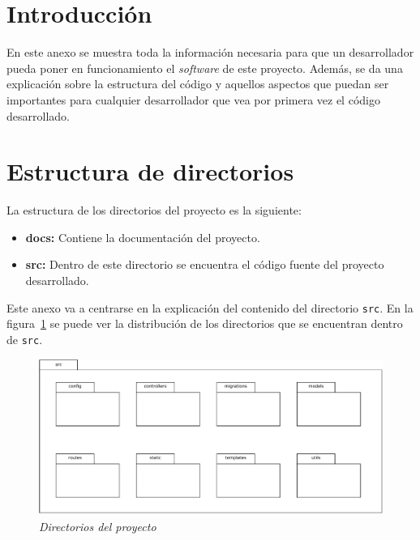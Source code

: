 
\section{Introducción}
En este anexo se muestra toda la información necesaria para que un desarrollador pueda poner en funcionamiento el \textit{software} de este proyecto.
Además, se da una explicación sobre la estructura del código y aquellos aspectos que puedan ser importantes para cualquier desarrollador que vea por primera vez el código desarrollado.

\section{Estructura de directorios}
La estructura de los directorios del proyecto es la siguiente:
\begin{itemize}
\item \textbf{docs:} Contiene la documentación del proyecto.
\item \textbf{src:} Dentro de este directorio se encuentra el código fuente del proyecto desarrollado.
\end{itemize}

Este anexo va a centrarse en la explicación del contenido del directorio \texttt{src}.
En la figura~\ref{fig:directorios} se puede ver la distribución de los directorios que se encuentran dentro de \texttt{src}.

\begin{figure}
	\centering
	\includegraphics[width=\textwidth]{../img/Anexos/directorios.pdf}
	\caption{\textit{Directorios del proyecto}}\label{fig:directorios}
\end{figure}

